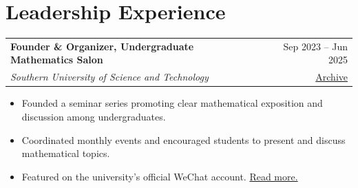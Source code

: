 \documentclass[a4paper,11pt]{article}
\makeatletter
\newcommand{\cventry}[4]{\par\addvspace{3pt}\begin{tabularx}{\linewidth}{@{}>{\raggedright\arraybackslash}X@{\hspace{1em}}r@{}}\textbf{#1} & #2 \\ \textit{#3} & #4\end{tabularx}\par}
\makeatother
\begin{document}
\section{Leadership Experience}
\cventry{Founder \& Organizer, Undergraduate Mathematics Salon}{Sep 2023 -- Jun 2025}{Southern University of Science and Technology}{\href{https://jinghua-xi.github.io/salon/}{Archive}}
\begin{itemize}
\item Founded a seminar series promoting clear mathematical exposition and discussion among undergraduates.
\item Coordinated monthly events and encouraged students to present and discuss mathematical topics.
\item Featured on the university's official WeChat account. \href{https://mp.weixin.qq.com/s/EpakX8Plu0SW1HP2v0rGkg}{Read more.}
\end{itemize}
\end{document}
